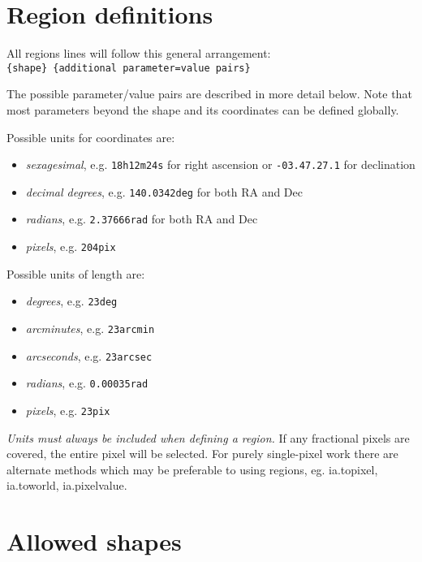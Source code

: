 \section{Region definitions}


All regions lines will follow this general arrangement:\\

{\tt \{shape\} \{additional parameter=value pairs\} }

The possible parameter/value pairs are described in more detail below.
Note that most parameters beyond the shape and its coordinates can be
defined globally.

Possible units for coordinates are:


\begin{itemize}
\item {\it sexagesimal}, e.g. {\tt 18h12m24s} for right ascension or {\tt -03.47.27.1} for declination
\item {\it decimal degrees}, e.g. {\tt 140.0342deg} for both RA and Dec
\item {\it radians}, e.g. {\tt 2.37666rad} for both RA and Dec 
\item {\it pixels}, e.g. {\tt 204pix}
\end{itemize}


Possible units of length are:


\begin{itemize}
\item {\it degrees}, e.g. {\tt 23deg}
\item {\it arcminutes}, e.g. {\tt 23arcmin}
\item {\it arcseconds}, e.g. {\tt 23arcsec}
\item {\it radians}, e.g. {\tt 0.00035rad}
\item {\it pixels}, e.g. {\tt 23pix}

\end{itemize}

{\it Units must always be included when defining a region.} If any
fractional pixels are covered, the entire pixel will be
selected. For purely single-pixel work there are alternate methods which may be preferable to using regions, eg. ia.topixel, ia.toworld, ia.pixelvalue.

\section{Allowed shapes}

